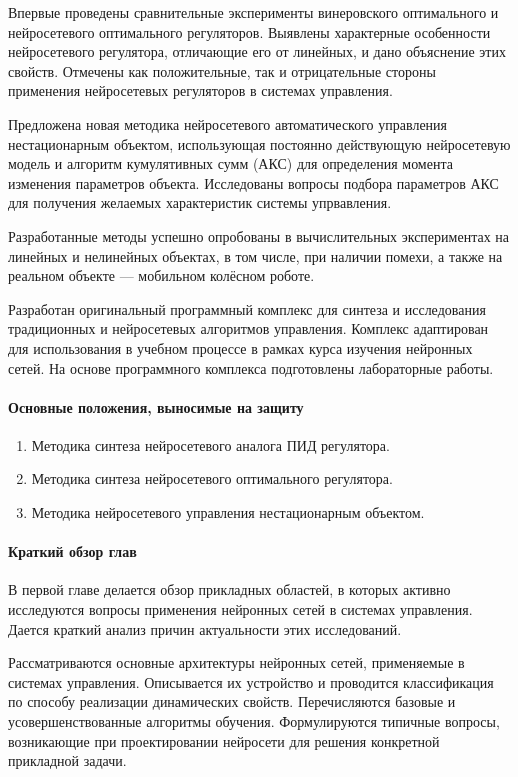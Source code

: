Впервые проведены сравнительные эксперименты винеровского оптимального
и нейросетевого оптимального регуляторов.  Выявлены характерные
особенности нейросетевого регулятора, отличающие его от линейных, и
дано объяснение этих свойств.  Отмечены как положительные, так и
отрицательные стороны применения нейросетевых регуляторов в системах
управления.

Предложена новая методика нейросетевого автоматического управления
нестационарным объектом, использующая постоянно действующую
нейросетевую модель и алгоритм кумулятивных сумм (АКС) для определения
момента изменения параметров объекта.  Исследованы вопросы подбора
параметров АКС для получения желаемых характеристик системы
упрвавления.

Разработанные методы успешно опробованы в вычислительных экспериментах
на линейных и нелинейных объектах, в том числе, при наличии помехи, а
также на реальном объекте --- мобильном колёсном роботе.

Разработан оригинальный программный комплекс для синтеза и
исследования традиционных и нейросетевых алгоритмов управления.
Комплекс адаптирован для использования в учебном процессе в рамках
курса изучения нейронных сетей.  На основе программного комплекса
подготовлены лабораторные работы.

\paragraph{Основные положения, выносимые на защиту}

\begin{enumerate}
\item Методика синтеза нейросетевого аналога ПИД регулятора.
\item Методика синтеза нейросетевого оптимального регулятора.
\item Методика нейросетевого управления нестационарным объектом.
\end{enumerate}

\paragraph{Краткий обзор глав}


В первой главе делается обзор прикладных областей, в которых активно
исследуются вопросы применения нейронных сетей в системах управления.
Дается краткий анализ причин актуальности этих исследований.

Рассматриваются основные архитектуры нейронных сетей, применяемые в
системах управления.  Описывается их устройство и проводится
классификация по способу реализации динамических свойств.
Перечисляются базовые и усовершенствованные алгоритмы обучения.
Формулируются типичные вопросы, возникающие при проектировании
нейросети для решения конкретной прикладной задачи.

